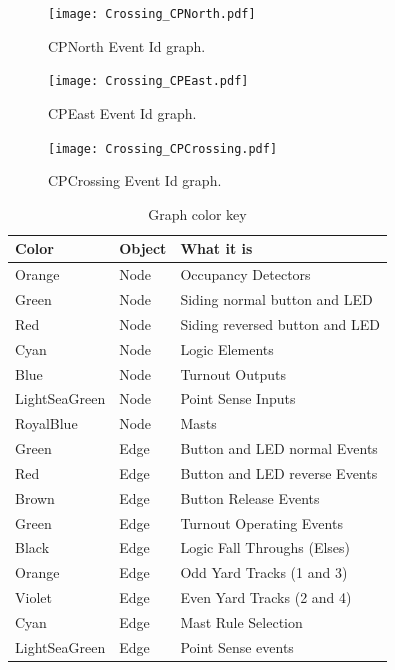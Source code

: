 \begin{figure}[hbpt]\begin{centering}%
\texttt{[image: Crossing\_CPNorth.pdf]}
\caption{CPNorth  Event Id graph.}
\label{fig:CrossingCPNorthEventFlow}
\end{centering}\end{figure}
\begin{figure}[hbpt]\begin{centering}%
\texttt{[image: Crossing\_CPEast.pdf]}
\caption{CPEast  Event Id graph.}
\label{fig:CrossingCPEastEventFlow}
\end{centering}\end{figure}
\begin{figure}[hbpt]\begin{centering}%
\texttt{[image: Crossing\_CPCrossing.pdf]}
\caption{CPCrossing Event Id graph.}
\label{fig:CrossingCPCrossing}
\end{centering}\end{figure}
\clearpage
\begin{table}[hbpt]\begin{centering}%
\begin{tabular}{|l|l|p{2in}|}
\hline
Color&Object&What it is\\
\hline
Orange&Node&Occupancy Detectors\\
\hline
Green&Node&Siding normal button and LED\\
\hline
Red&Node&Siding reversed button and LED\\
\hline
Cyan&Node&Logic Elements\\
\hline
Blue&Node&Turnout Outputs\\
\hline
LightSeaGreen&Node&Point Sense Inputs\\
\hline
RoyalBlue&Node&Masts\\
\hline 
Green&Edge&Button and LED normal Events\\
\hline
Red&Edge&Button and LED reverse Events\\
\hline
Brown&Edge&Button Release Events\\
\hline
Green&Edge&Turnout Operating Events\\
\hline
Black&Edge&Logic Fall Throughs (Elses)\\
\hline
Orange&Edge&Odd Yard Tracks (1 and 3)\\
\hline
Violet&Edge&Even Yard Tracks (2 and 4)\\
\hline
Cyan&Edge&Mast Rule Selection\\
\hline
LightSeaGreen&Edge&Point Sense events\\
\hline
\end{tabular}
\caption{Graph color key}
\label{tab:ExampleSidingCP1EventFlow}
\end{centering}\end{table}


\clearpage
